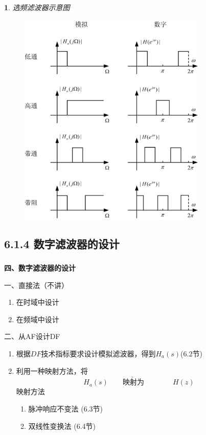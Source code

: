 \documentclass[notheorems,compress,mathserif,table]{beamer}
\newtheorem{dablock}{}
\begin{document}
\begin{frame}[shrink]\frametitle{}%
\begin{dablock}\centering
选频滤波器示意图
\end{dablock}
\begin{figure}[h]
\centering
\includegraphics[width=0.8\textwidth]{fig4dtgtdtdz.jpg}
\end{figure}
\end{frame}
\subsection{6.1.4 数字滤波器的设计}
\begin{frame}\frametitle{}%
\textbf{四、数字滤波器的设计}
\newline

一、直接法（不讲）
\begin{enumerate}
\item [1] 在时域中设计
\item [2] 在频域中设计
\end{enumerate}
二、从AF设计DF
\begin{enumerate}
\item [1]  根据$DF$技术指标要求设计模拟滤波器，得到$H_{a}(s)$(6.2节)
\item [2] 利用一种映射方法，将    $$H_{a}(s)\underrightarrow{\quad\quad\mbox{映射为}\quad\quad}
{\quad\quad}H(z)$$
映射方法
\begin{enumerate}
\item [(1)] 脉冲响应不变法 \quad (6.3节)
\item [(2)] 双线性变换法  \qquad (6.4节)
\end{enumerate}
\end{enumerate}
\end{frame}
\end{document}

